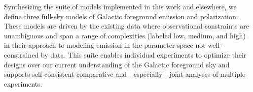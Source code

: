 \documentclass[twocolumn]{aastex631}
\newcommand{\giuse}[1]{\textcolor{orange}{(GP: #1)}}
\begin{document}



Synthesizing the suite of models implemented in this work and elsewhere, we define three full-sky models of Galactic foreground emission and polarization. These models are driven by the existing data where observational constraints are unambiguous and span a range of complexities (labeled low, medium, and high) in their approach to modeling emission in the parameter space not well-constrained by data. This suite enables individual experiments to optimize their designs over our current understanding of the Galactic foreground sky and supports self-consistent comparative and---especially---joint analyses of multiple experiments. 
\end{document}
